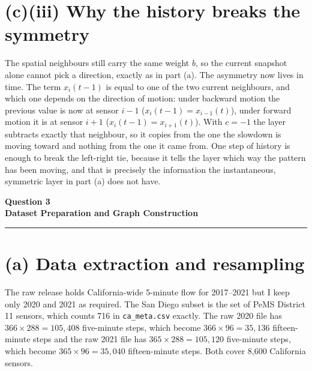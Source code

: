 \documentclass[11pt,letterpaper]{article}
\newcommand{\taskbanner}[2]{\begin{center}{\small\bfseries #1}\\[3pt]{\Large\bfseries #2}\end{center}\vspace{2pt}\hrule\vspace{8pt}}
\begin{document}
\section*{(c)(iii) Why the history breaks the symmetry}

The spatial neighbours still carry the same weight $b$, so the current snapshot alone cannot
pick a direction, exactly as in part (a). The asymmetry now lives in time. The term
$x_i(t-1)$ is equal to one of the two current neighbours, and which one depends on the
direction of motion: under backward motion the previous value is now at sensor $i - 1$
($x_i(t-1) = x_{i-1}(t)$), under forward motion it is at sensor $i + 1$ ($x_i(t-1) =
x_{i+1}(t)$). With $c = -1$ the layer subtracts exactly that neighbour, so it copies from the
one the slowdown is moving toward and nothing from the one it came from. One step of history
is enough to break the left-right tie, because it tells the layer which way the pattern has
been moving, and that is precisely the information the instantaneous, symmetric layer in part
(a) does not have.

\newpage

\taskbanner{Question 3}{Dataset Preparation and Graph Construction}

\section*{(a) Data extraction and resampling}

The raw release holds California-wide 5-minute flow for 2017--2021 but I keep only 2020 and
2021 as required. The San Diego subset is the set of PeMS District 11 sensors, which counts
716 in \texttt{ca\_meta.csv} exactly. The raw 2020 file has $366 \times 288 = 105{,}408$
five-minute steps, which become $366 \times 96 = 35{,}136$
fifteen-minute steps and the raw 2021 file has $365 \times 288 = 105{,}120$ five-minute steps,
which become $365 \times 96 = 35{,}040$ fifteen-minute steps. Both cover 8{,}600 California
sensors.
\end{document}
